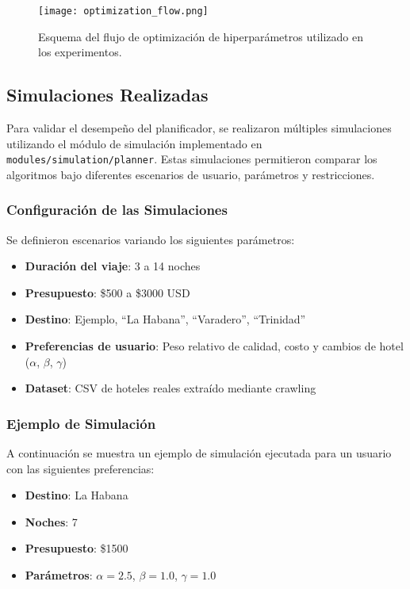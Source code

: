 \documentclass[runningheads]{llncs}
\begin{document}
\begin{figure}[H]
    \centering
    \texttt{[image: optimization\_flow.png]}
    \caption{Esquema del flujo de optimización de hiperparámetros utilizado en los experimentos.}
    \label{fig:optimization_flow}
\end{figure}



\subsection{Simulaciones Realizadas}

Para validar el desempeño del planificador, se realizaron múltiples simulaciones utilizando el módulo de simulación implementado en \texttt{modules/simulation/planner}. Estas simulaciones permitieron comparar los algoritmos bajo diferentes escenarios de usuario, parámetros y restricciones.

\subsubsection{Configuración de las Simulaciones}

Se definieron escenarios variando los siguientes parámetros:
\begin{itemize}
    \item \textbf{Duración del viaje}: 3 a 14 noches
    \item \textbf{Presupuesto}: \$500 a \$3000 USD
    \item \textbf{Destino}: Ejemplo, ``La Habana'', ``Varadero'', ``Trinidad''
    \item \textbf{Preferencias de usuario}: Peso relativo de calidad, costo y cambios de hotel ($\alpha$, $\beta$, $\gamma$)
    \item \textbf{Dataset}: CSV de hoteles reales extraído mediante crawling
\end{itemize}

\subsubsection{Ejemplo de Simulación}

A continuación se muestra un ejemplo de simulación ejecutada para un usuario con las siguientes preferencias:
\begin{itemize}
    \item \textbf{Destino}: La Habana
    \item \textbf{Noches}: 7
    \item \textbf{Presupuesto}: \$1500
    \item \textbf{Parámetros}: $\alpha=2.5$, $\beta=1.0$, $\gamma=1.0$
\end{itemize}
\end{document}
